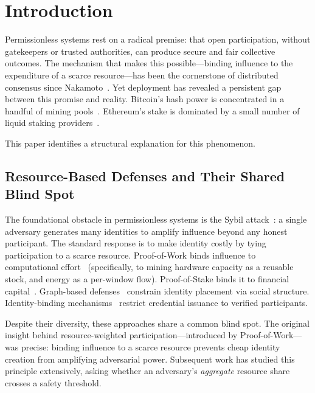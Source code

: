 \documentclass[manuscript,review]{acmart}
\theoremstyle{remark}
\begin{document}
	\maketitle
	
	\section{Introduction}
	\label{sec:intro}
	
	Permissionless systems rest on a radical premise: that open
	participation, without gatekeepers or trusted authorities,
	can produce secure and fair collective outcomes.
	The mechanism that makes this possible---binding influence
	to the expenditure of a scarce resource---has been the
	cornerstone of distributed consensus since
	Nakamoto~\cite{nakamoto2008bitcoin}.
	Yet deployment has revealed a persistent gap between
	this promise and reality.
	Bitcoin's hash power is concentrated in a handful of
	mining pools~\cite{gencer2018decentralization}.
	Ethereum's stake is dominated by a small number of
	liquid staking providers~\cite{lido2023concentration}.
	
	This paper identifies a structural explanation for this phenomenon.
	
	\subsection{Resource-Based Defenses and Their Shared Blind Spot}
	\label{ssec:sybil}
	
	The foundational obstacle in permissionless systems is the
	Sybil attack~\cite{douceur2002sybil}: a single adversary
	generates many identities to amplify influence beyond any
	honest participant.
	The standard response is to make identity costly by tying
	participation to a scarce resource.
	Proof-of-Work binds influence to computational
	effort~\cite{nakamoto2008bitcoin,garay2015backbone}
	(specifically, to mining hardware capacity as a
	reusable stock, and energy as a per-window flow).
	Proof-of-Stake binds it to financial
	capital~\cite{kiayias2017ouroboros}.
	Graph-based defenses~\cite{yu2006sybilguard,yu2008sybillimit}
	constrain identity placement via social structure.
	Identity-binding mechanisms~\cite{borge2017pop,ford2020pseudonym}
	restrict credential issuance to verified participants.
	
	Despite their diversity, these approaches share a common
	blind spot.
	The original insight behind resource-weighted
	participation---introduced by Proof-of-Work---was
	precise: binding influence to a scarce resource
	prevents cheap identity creation from amplifying
	adversarial power.
	Subsequent work has studied this principle extensively,
	asking whether an adversary's \emph{aggregate} resource
	share crosses a safety threshold.
	
\end{document}
